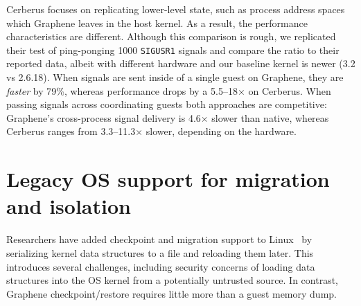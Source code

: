 Cerberus focuses on replicating lower-level state, such as process address spaces
which Graphene leaves in the host kernel.
As a result, the performance characteristics are different.
Although this comparison is rough, 
we replicated their test of ping-ponging 1000 
{\tt SIGUSR1} signals and compare the ratio to their reported data, 
albeit with different hardware and our baseline kernel is newer 
(3.2 vs 2.6.18).  
When signals are sent inside of a single guest on Graphene, they are {\em faster}
by 79\%, whereas performance drops by a 5.5--18$\times$ on Cerberus.
When passing signals across coordinating guests both approaches are competitive:
Graphene's cross-process signal delivery is 4.6$\times$ slower than native, whereas Cerberus ranges from 
3.3--11.3$\times$ slower, depending on the hardware.



\section{Legacy OS support for migration and isolation}

Researchers have added checkpoint and migration support to Linux~\citep{linux-cr}
by serializing kernel data structures to a file
and reloading them later.  
This introduces several challenges, including
security concerns of loading data structures into the OS kernel from a potentially 
untrusted source.
In contrast, Graphene checkpoint/restore 
requires little more than a guest memory dump.


